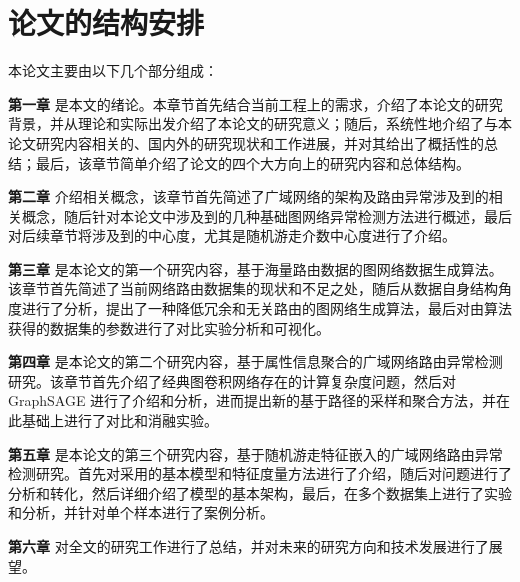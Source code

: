 \section{论文的结构安排}

本论文主要由以下几个部分组成：

\textbf{第一章} 是本文的绪论。本章节首先结合当前工程上的需求，介绍了本论文的研究背景，并从理论和实际出发介绍了本论文的研究意义；随后，系统性地介绍了与本论文研究内容相关的、国内外的研究现状和工作进展，并对其给出了概括性的总结；最后，该章节简单介绍了论文的四个大方向上的研究内容和总体结构。

\textbf{第二章} 介绍相关概念，该章节首先简述了广域网络的架构及路由异常涉及到的相关概念，随后针对本论文中涉及到的几种基础图网络异常检测方法进行概述，最后对后续章节将涉及到的中心度，尤其是随机游走介数中心度进行了介绍。

\textbf{第三章} 是本论文的第一个研究内容，基于海量路由数据的图网络数据生成算法。该章节首先简述了当前网络路由数据集的现状和不足之处，随后从数据自身结构角度进行了分析，提出了一种降低冗余和无关路由的图网络生成算法，最后对由算法获得的数据集的参数进行了对比实验分析和可视化。

\textbf{第四章} 是本论文的第二个研究内容，基于属性信息聚合的广域网络路由异常检测研究。该章节首先介绍了经典图卷积网络存在的计算复杂度问题，然后对 GraphSAGE 进行了介绍和分析，进而提出新的基于路径的采样和聚合方法，并在此基础上进行了对比和消融实验。

\textbf{第五章} 是本论文的第三个研究内容，基于随机游走特征嵌入的广域网络路由异常检测研究。首先对采用的基本模型和特征度量方法进行了介绍，随后对问题进行了分析和转化，然后详细介绍了模型的基本架构，最后，在多个数据集上进行了实验和分析，并针对单个样本进行了案例分析。

\textbf{第六章} 对全文的研究工作进行了总结，并对未来的研究方向和技术发展进行了展望。


